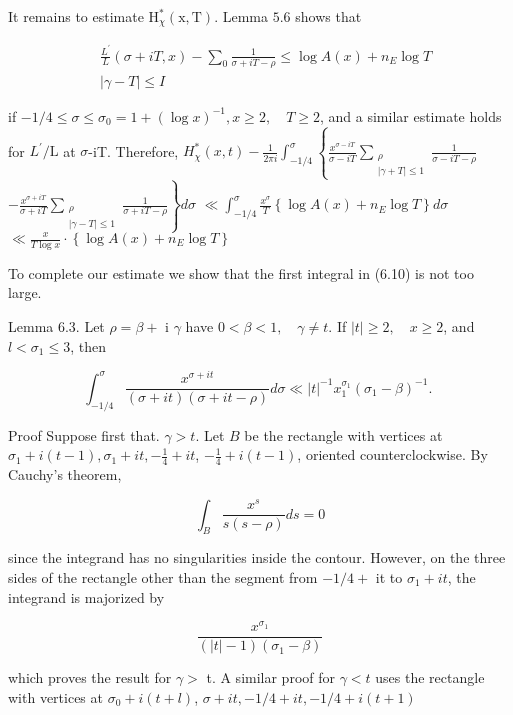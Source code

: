It remains to estimate $\mathrm{H}_{\chi}^{*}(\mathrm{x}, \mathrm{T})$. Lemma $5.6$ shows that

$$
\begin{aligned}
& \frac{L^{\prime}}{L}(\sigma+i T, x)-\sum_{0} \frac{1}{\sigma+i T-\rho} \leqslant \log A(x)+n_{E} \log T \\
& |\gamma-T| \leqslant I 
\end{aligned}
$$

if $-1 / 4 \leqslant \sigma \leqslant \sigma_{0}=1+(\log x)^{-1}, x \geqslant 2, \quad T \geqslant 2$, and a similar estimate holds for $L^{\prime} / \mathrm{L}$ at $\sigma$-iT. Therefore, $H_{\chi}^{*}(x, t)-\frac{1}{2 \pi i} \int_{-1 / 4}^{\sigma}\left\{\frac{x^{\sigma-i T}}{\sigma-i T} \sum_{\substack{\rho \\|\gamma+T| \leqslant 1}} \frac{1}{\sigma-i T-\rho}\right.$ $\left.-\frac{x^{\sigma+i T}}{\sigma+i T} \sum_{\substack{\rho \\|\gamma-T| \leqslant 1}} \frac{1}{\sigma+i T-\rho}\right\} d \sigma$ $\ll \int_{-1 / 4}^{\sigma} \frac{x^{\sigma}}{T}\left\{\log A(x)+n_{E} \log T\right\} d \sigma$ $\ll \frac{x}{T \log x} \cdot\left\{\log A(x)+n_{E} \log T\right\}$

To complete our estimate we show that the first integral in (6.10) is not too large.

Lemma 6.3. Let $\rho=\beta+$ i $\gamma$ have $0<\beta<1, \quad \gamma \neq t$. If $|t| \geqslant 2, \quad x \geqslant 2$, and $l<\sigma_{1} \leqslant 3$, then

$$
\int_{-1 / 4}^{\sigma} \frac{x^{\sigma+i t}}{(\sigma+i t)(\sigma+i t-\rho)} d \sigma \ll|t|^{-1} x_{1}^{\sigma_{1}}\left(\sigma_{1}-\beta\right)^{-1} \text {. }
$$

Proof Suppose first that. $\gamma>t$. Let $B$ be the rectangle with vertices at $\sigma_{1}+i(t-1), \sigma_{1}+i t,-\frac{1}{4}+i t$, $-\frac{1}{4}+i(t-1)$, oriented counterclockwise. By Cauchy's theorem,

$$
\int_{B} \frac{x^{s}}{s(s-\rho)} d s=0
$$

since the integrand has no singularities inside the contour. However, on the three sides of the rectangle other than the segment from $-1 / 4+$ it to $\sigma_{1}+i t$, the integrand is majorized by

$$
\frac{x^{\sigma_{1}}}{(|t|-1)\left(\sigma_{1}-\beta\right)}
$$

which proves the result for $\gamma>$ t. A similar proof for $\gamma<t$ uses the rectangle with vertices at $\sigma_{0}+i(t+l)$, $\sigma+i t,-1 / 4+i t,-1 / 4+i(t+1)$

